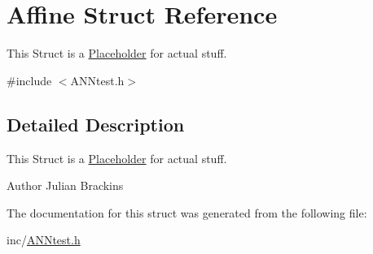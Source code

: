\hypertarget{structAffine}{\section{Affine Struct Reference}
\label{structAffine}
}


This Struct is a \hyperlink{structPlaceholder}{Placeholder} for actual stuff.  




{\ttfamily \#include $<$A\-N\-Ntest.\-h$>$}



\subsection{Detailed Description}
This Struct is a \hyperlink{structPlaceholder}{Placeholder} for actual stuff. 

\begin{DoxyAuthor}{Author}
Julian Brackins 
\end{DoxyAuthor}


The documentation for this struct was generated from the following file\-:\begin{DoxyCompactItemize}
\item 
inc/\hyperlink{ANNtest_8h}{A\-N\-Ntest.\-h}\end{DoxyCompactItemize}
